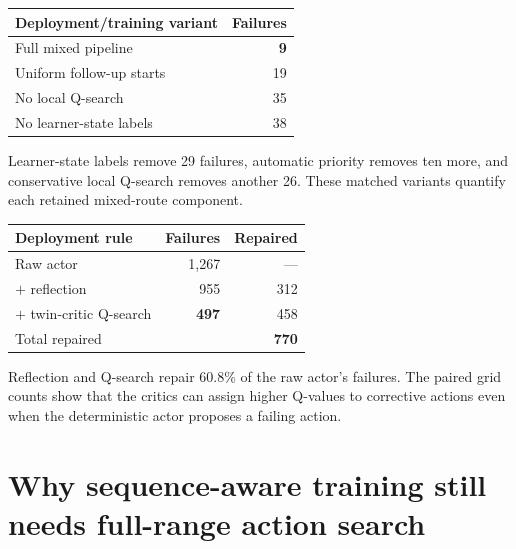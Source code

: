\vspace{4mm}
\begin{minipage}[t]{.47\textwidth}
\centering
\footnotesize
{}
\label{tab:mixed-ablation}
\begin{tabular}{lr}
\toprule
Deployment/training variant & Failures\\
\midrule
Full mixed pipeline & \textbf{9}\\
Uniform follow-up starts & 19\\
No local Q-search & 35\\
No learner-state labels & 38\\
\bottomrule
\end{tabular}

\vspace{1mm}
\footnotesize\raggedright
Learner-state labels remove 29 failures, automatic priority removes ten more, and conservative local Q-search removes another 26. These matched variants quantify each retained mixed-route component.
\end{minipage}\hfill
\begin{minipage}[t]{.47\textwidth}
\centering
\footnotesize
{}
\label{tab:pure-ablation}
\begin{tabular}{lrr}
\toprule
Deployment rule & Failures & Repaired\\
\midrule
Raw actor & 1,267 & ---\\
$+$ reflection & 955 & 312\\
$+$ twin-critic Q-search & \textbf{497} & 458\\
\midrule
Total repaired & & \textbf{770}\\
\bottomrule
\end{tabular}

\vspace{1mm}
\footnotesize\raggedright
Reflection and Q-search repair 60.8\% of the raw actor's failures. The paired grid counts show that the critics can assign higher Q-values to corrective actions even when the deterministic actor proposes a failing action.
\end{minipage}

\clearpage
\onecolumn
\section{Why sequence-aware training still needs full-range action search}

